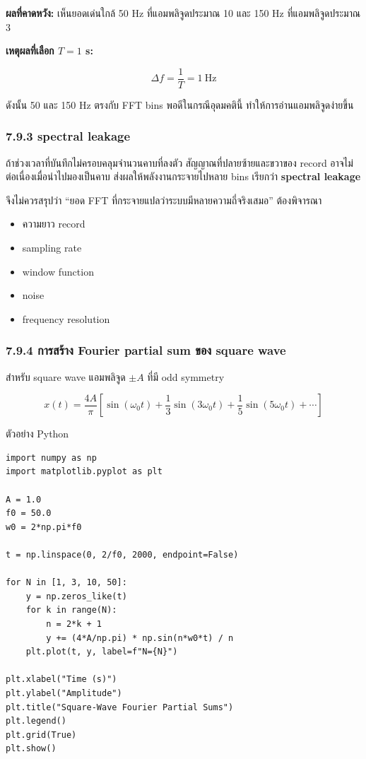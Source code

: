 \textbf{ผลที่คาดหวัง:} เห็นยอดเด่นใกล้ 50 Hz ที่แอมพลิจูดประมาณ 10 และ 150 Hz ที่แอมพลิจูดประมาณ 3

\textbf{เหตุผลที่เลือก $T=1$ s:}

\[
\Delta f=\frac{1}{T}=1\ \text{Hz}
\]

ดังนั้น 50 และ 150 Hz ตรงกับ FFT bins พอดีในกรณีอุดมคตินี้ ทำให้การอ่านแอมพลิจูดง่ายขึ้น

\subsubsection{7.9.3 spectral leakage}

ถ้าช่วงเวลาที่บันทึกไม่ครอบคลุมจำนวนคาบที่ลงตัว สัญญาณที่ปลายซ้ายและขวาของ record อาจไม่ต่อเนื่องเมื่อนำไปมองเป็นคาบ ส่งผลให้พลังงานกระจายไปหลาย bins เรียกว่า \textbf{spectral leakage}

จึงไม่ควรสรุปว่า “ยอด FFT ที่กระจายแปลว่าระบบมีหลายความถี่จริงเสมอ” ต้องพิจารณา

\begin{itemize}
    \item ความยาว record
    \item sampling rate
    \item window function
    \item noise
    \item frequency resolution
\end{itemize}

\subsubsection{7.9.4 การสร้าง Fourier partial sum ของ square wave}

สำหรับ square wave แอมพลิจูด $\pm A$ ที่มี odd symmetry

\[
x(t)=\frac{4A}{\pi}\left[
\sin(\omega_0t)+\frac{1}{3}\sin(3\omega_0t)+\frac{1}{5}\sin(5\omega_0t)+\cdots
\right]
\]

ตัวอย่าง Python

\begin{verbatim}
import numpy as np
import matplotlib.pyplot as plt

A = 1.0
f0 = 50.0
w0 = 2*np.pi*f0

t = np.linspace(0, 2/f0, 2000, endpoint=False)

for N in [1, 3, 10, 50]:
    y = np.zeros_like(t)
    for k in range(N):
        n = 2*k + 1
        y += (4*A/np.pi) * np.sin(n*w0*t) / n
    plt.plot(t, y, label=f"N={N}")

plt.xlabel("Time (s)")
plt.ylabel("Amplitude")
plt.title("Square-Wave Fourier Partial Sums")
plt.legend()
plt.grid(True)
plt.show()
\end{verbatim}

